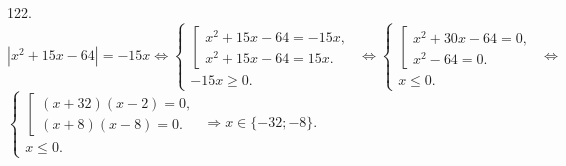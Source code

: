 122. $|x^2+15x-64|=-15x\Leftrightarrow \begin{cases}\left[\begin{array}{l} x^2+15x-64=-15x,\\ x^2+15x-64=15x.\end{array}\right.\\ -15x\geqslant0.\end{cases}
\Leftrightarrow \begin{cases}\left[\begin{array}{l} x^2+30x-64=0,\\ x^2-64=0.\end{array}\right.\\ x\leqslant0.\end{cases}
\Leftrightarrow$\\$ \begin{cases}\left[\begin{array}{l} (x+32)(x-2)=0,\\ (x+8)(x-8)=0.\end{array}\right.\\ x\leqslant0.\end{cases}\Rightarrow
x\in\{-32;-8\}.$\\
